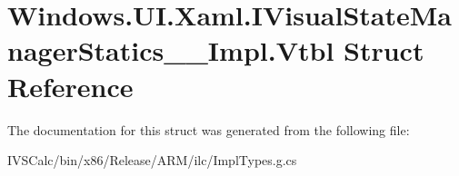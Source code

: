 \hypertarget{struct_windows_1_1_u_i_1_1_xaml_1_1_i_visual_state_manager_statics_____impl_1_1_vtbl}{}\section{Windows.\+U\+I.\+Xaml.\+I\+Visual\+State\+Manager\+Statics\+\_\+\+\_\+\+Impl.\+Vtbl Struct Reference}
\label{struct_windows_1_1_u_i_1_1_xaml_1_1_i_visual_state_manager_statics_____impl_1_1_vtbl}


The documentation for this struct was generated from the following file\+:\begin{DoxyCompactItemize}
\item 
I\+V\+S\+Calc/bin/x86/\+Release/\+A\+R\+M/ilc/Impl\+Types.\+g.\+cs\end{DoxyCompactItemize}
